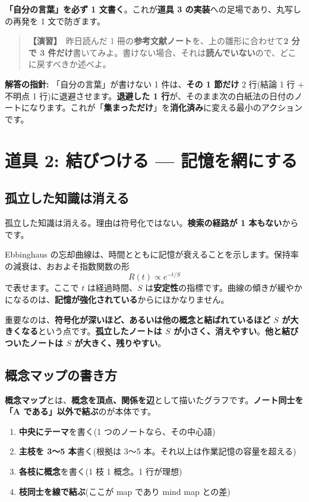 \documentclass{article}
\begin{document}
\textbf{「自分の言葉」を必ず 1 文書く}。これが\textbf{道具 3 の実装}への足場であり、丸写しの再発を 1 文で防ぎます。

\begin{quote}
\textbf{【演習】}\ 昨日読んだ 1 冊の\textbf{参考文献ノート}を、上の雛形に合わせて\textbf{2 分で 3 件だけ}書いてみよ。書けない場合、それは\textbf{読んでいない}ので、どこに戻すべきか述べよ。
\end{quote}

\textbf{解答の指針:} 「自分の言葉」が書けない 1 件は、\textbf{その 1 節だけ} 2 行(結論 1 行 + 不明点 1 行)に退避させます。\textbf{退避した 1 行}が、そのまま次の白紙法の日付のノートになります。これが「\textbf{集まっただけ}」を\textbf{消化済み}に変える最小のアクションです。

\section{道具 2: 結びつける — 記憶を網にする}

\subsection{孤立した知識は消える}

孤立した知識は消える。理由は符号化ではない。\textbf{検索の経路が 1 本もない}からです。

Ebbinghaus の忘却曲線は、時間とともに記憶が衰えることを示します。保持率の減衰は、おおよそ指数関数の形
\[ R(t) \propto e^{-t/S} \]
で表せます。ここで \(t\) は経過時間、\(S\) は\textbf{安定性}の指標です。曲線の傾きが緩やかになるのは、\textbf{記憶が強化されている}からにほかなりません。

重要なのは、\textbf{符号化が深いほど、あるいは他の概念と結ばれているほど \(S\) が大きくなる}という点です。\textbf{孤立したノートは \(S\) が小さく、消えやすい}。\textbf{他と結びついたノートは \(S\) が大きく、残りやすい}。

\subsection{概念マップの書き方}

\textbf{概念マップ}とは、\textbf{概念を頂点、関係を辺}として描いたグラフです。\textbf{ノート同士を「A である」以外で結ぶ}のが本体です。

\begin{enumerate}
\item \textbf{中央にテーマ}を書く(1 つのノートなら、その中心語)
\item \textbf{主枝を 3〜5 本}書く(根拠は 3〜5 本。それ以上は作業記憶の容量を超える)
\item \textbf{各枝に概念}を書く(1 枝 1 概念。1 行が理想)
\item \textbf{枝同士を線で結ぶ}(ここが map であり mind map との差)
\end{enumerate}
\end{document}
